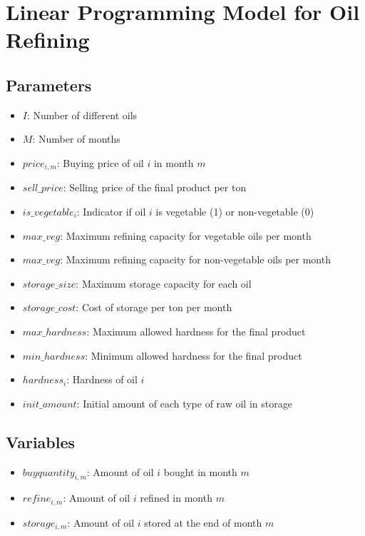 \documentclass{article}
\begin{document}
\section*{Linear Programming Model for Oil Refining}

\subsection*{Parameters}
\begin{itemize}
    \item $I$: Number of different oils
    \item $M$: Number of months
    \item $price_{i,m}$: Buying price of oil $i$ in month $m$
    \item $sell\_price$: Selling price of the final product per ton
    \item $is\_vegetable_{i}$: Indicator if oil $i$ is vegetable (1) or non-vegetable (0)
    \item $max\_veg$: Maximum refining capacity for vegetable oils per month
    \item $max\_veg$: Maximum refining capacity for non-vegetable oils per month
    \item $storage\_size$: Maximum storage capacity for each oil
    \item $storage\_cost$: Cost of storage per ton per month
    \item $max\_hardness$: Maximum allowed hardness for the final product
    \item $min\_hardness$: Minimum allowed hardness for the final product
    \item $hardness_{i}$: Hardness of oil $i$
    \item $init\_amount$: Initial amount of each type of raw oil in storage
\end{itemize}

\subsection*{Variables}
\begin{itemize}
    \item $buyquantity_{i,m}$: Amount of oil $i$ bought in month $m$
    \item $refine_{i,m}$: Amount of oil $i$ refined in month $m$
    \item $storage_{i,m}$: Amount of oil $i$ stored at the end of month $m$
\end{itemize}
\end{document}
